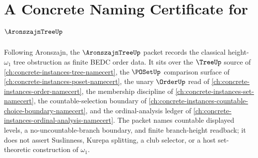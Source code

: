 \chapter{A Concrete Naming Certificate for $\AronszajnTreeUp$}
\label{ch:concrete-instances-aronszajn-tree-namecert}

Following Aronszajn, the $\AronszajnTreeUp$ packet records the classical height-$\omega_1$ tree obstruction as finite BEDC order data. It sits over the $\TreeUp$ source of \autoref{ch:concrete-instances-tree-namecert}, the $\POSetUp$ comparison surface of \autoref{ch:concrete-instances-poset-namecert}, the unary $\OrderUp$ read of \autoref{ch:concrete-instances-order-namecert}, the membership discipline of \autoref{ch:concrete-instances-set-namecert}, the countable-selection boundary of \autoref{ch:concrete-instances-countable-choice-boundary-namecert}, and the ordinal-analysis ledger of \autoref{ch:concrete-instances-ordinal-analysis-namecert}. The packet names countable displayed levels, a no-uncountable-branch boundary, and finite branch-height readback; it does not assert Suslinness, Kurepa splitting, a club selector, or a host set-theoretic construction of $\omega_1$.

